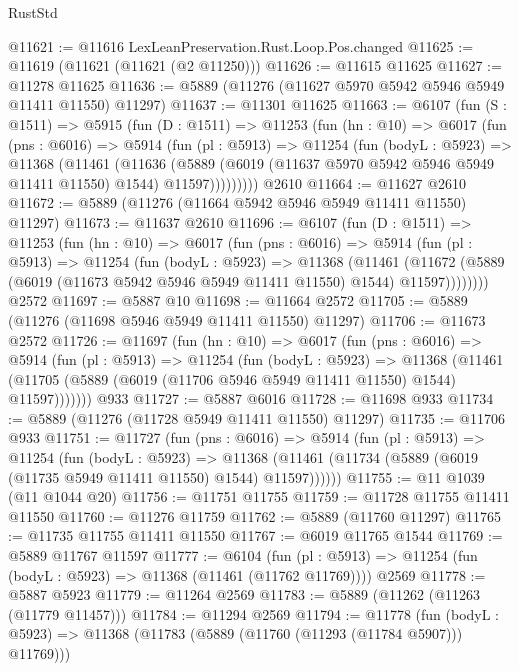 \begin{lexlean}{RustStd}
\begin{coremodule}
@11621 := @11616 LexLeanPreservation.Rust.Loop.Pos.changed
@11625 := @11619 (@11621 (@11621 (@2 @11250)))
@11626 := @11615 @11625
@11627 := @11278 @11625
@11636 := @5889 (@11276 (@11627 @5970 @5942 @5946 @5949 @11411 @11550) @11297)
@11637 := @11301 @11625
@11663 := @6107
    (fun (S : @1511) =>
    @5915
      (fun (D : @1511) =>
      @11253
        (fun (hn : @10) =>
        @6017
          (fun (pns : @6016) =>
          @5914
            (fun (pl : @5913) =>
            @11254
              (fun (bodyL : @5923) =>
              @11368
                (@11461
                  (@11636
                    (@5889
                      (@6019 (@11637 @5970 @5942 @5946 @5949 @11411 @11550) @1544)
                      @11597)))))))))
    @2610
@11664 := @11627 @2610
@11672 := @5889 (@11276 (@11664 @5942 @5946 @5949 @11411 @11550) @11297)
@11673 := @11637 @2610
@11696 := @6107
    (fun (D : @1511) =>
    @11253
      (fun (hn : @10) =>
      @6017
        (fun (pns : @6016) =>
        @5914
          (fun (pl : @5913) =>
          @11254
            (fun (bodyL : @5923) =>
            @11368
              (@11461
                (@11672 (@5889 (@6019 (@11673 @5942 @5946 @5949 @11411 @11550) @1544) @11597))))))))
    @2572
@11697 := @5887 @10
@11698 := @11664 @2572
@11705 := @5889 (@11276 (@11698 @5946 @5949 @11411 @11550) @11297)
@11706 := @11673 @2572
@11726 := @11697
    (fun (hn : @10) =>
    @6017
      (fun (pns : @6016) =>
      @5914
        (fun (pl : @5913) =>
        @11254
          (fun (bodyL : @5923) =>
          @11368
            (@11461 (@11705 (@5889 (@6019 (@11706 @5946 @5949 @11411 @11550) @1544) @11597)))))))
    @933
@11727 := @5887 @6016
@11728 := @11698 @933
@11734 := @5889 (@11276 (@11728 @5949 @11411 @11550) @11297)
@11735 := @11706 @933
@11751 := @11727
    (fun (pns : @6016) =>
    @5914
      (fun (pl : @5913) =>
      @11254
        (fun (bodyL : @5923) =>
        @11368 (@11461 (@11734 (@5889 (@6019 (@11735 @5949 @11411 @11550) @1544) @11597))))))
@11755 := @11 @1039 (@11 @1044 @20)
@11756 := @11751 @11755
@11759 := @11728 @11755 @11411 @11550
@11760 := @11276 @11759
@11762 := @5889 (@11760 @11297)
@11765 := @11735 @11755 @11411 @11550
@11767 := @6019 @11765 @1544
@11769 := @5889 @11767 @11597
@11777 := @6104
    (fun (pl : @5913) => @11254 (fun (bodyL : @5923) => @11368 (@11461 (@11762 @11769))))
    @2569
@11778 := @5887 @5923
@11779 := @11264 @2569
@11783 := @5889 (@11262 (@11263 (@11779 @11457)))
@11784 := @11294 @2569
@11794 := @11778
    (fun (bodyL : @5923) => @11368 (@11783 (@5889 (@11760 (@11293 (@11784 @5907))) @11769)))

\end{coremodule}
\end{lexlean}

